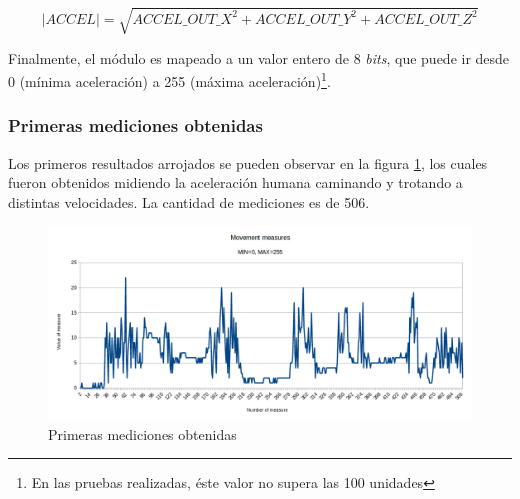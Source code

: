 \documentclass{article}
\newcommand{ \fnmodulo }{\footnote{En las pruebas realizadas, éste valor no supera las 100 unidades}}
\begin{document}
    \[ |ACCEL| = \sqrt{ ACCEL\_OUT\_X^2 + ACCEL\_OUT\_Y^2 + ACCEL\_OUT\_Z^2 } \]

    Finalmente, el módulo es mapeado a un valor entero de 8 \emph{bits}, que 
    puede ir desde 0 (mínima aceleración) a 255 (máxima aceleración)\fnmodulo.
    
    \subsubsection{Primeras mediciones obtenidas}
    Los primeros resultados arrojados se pueden observar en la figura 
    \ref{fig:resultados_devkit}, los cuales fueron obtenidos midiendo la 
    aceleración humana caminando y trotando a distintas velocidades. La 
    cantidad de mediciones es de 506.

    \begin{figure}[H]
        \includegraphics[width=1.0 \textwidth, center]{../primeras/results_devkit.png}
        \caption{Primeras mediciones obtenidas}
        \label{fig:resultados_devkit}
    \end{figure}
\end{document}
